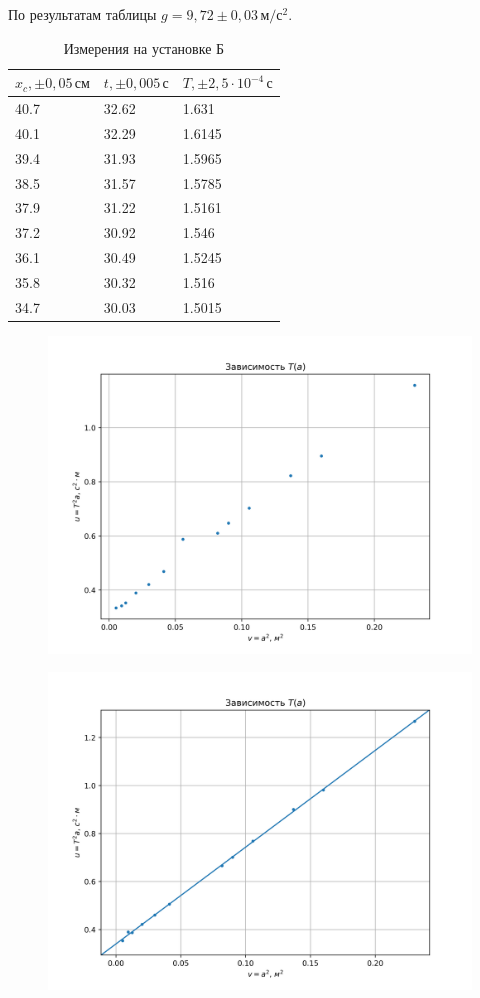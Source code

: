 По результатам таблицы $g=9{,}72\pm0{,}03\,\text{м}/\text{с}^2$.

\begin{table}[!ht]
    \centering
    \caption{Измерения на установке Б}
    \begin{tabular}{|l|l|l|}
    \hline
        $x_c,\pm 0{,}05\,\text{см}$ & $t,\pm 0{,}005\,\text{с}$ & $T,\pm 2{,}5\cdot 10^{-4}\,\text{с}$ \\ \hline
        40.7 & 32.62 & 1.631 \\ \hline
        40.1 & 32.29 & 1.6145 \\ \hline
        39.4 & 31.93 & 1.5965 \\ \hline
        38.5 & 31.57 & 1.5785 \\ \hline
        37.9 & 31.22 & 1.5161 \\ \hline
        37.2 & 30.92 & 1.546 \\ \hline
        36.1 & 30.49 & 1.5245 \\ \hline
        35.8 & 30.32 & 1.516 \\ \hline
        34.7 & 30.03 & 1.5015 \\ \hline
    \end{tabular}
\end{table}

\begin{figure}
    \centering\includegraphics[width=0.8\linewidth]{img/a.png}
\end{figure}

\begin{figure}
    \centering\includegraphics[width=0.8\linewidth]{img/b.png}
\end{figure}

